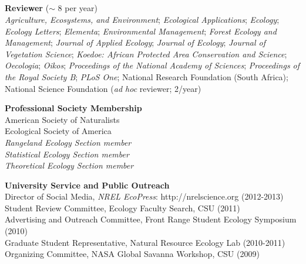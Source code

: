 \documentclass[margin,line]{resume}
\begin{document}
\begin{resume}
     \section{\textmd{\textsf{\color{MidnightBlue}{Professional\\Service}}}}
    \textbf{Reviewer} ($\sim$ 8 per year)\\
    \textsl{Agriculture, Ecosystems, and Environment};
    \textsl{Ecological Applications};
    \textsl{Ecology};
    \textsl{Ecology Letters};
    \textsl{Elementa};
    \textsl{Environmental Management};
    \textsl{Forest Ecology and Management};
    \textsl{Journal of Applied Ecology};
    \textsl{Journal of Ecology};
    \textsl{Journal of Vegetation Science};
    \textsl{Koedoe: African Protected Area Conservation and Science};
    \textsl{Oecologia};
    \textsl{Oikos};
    \textsl{Proceedings of the National Academy of Sciences};
    \textsl{Proceedings of the Royal Society B};
     \textsl{PLoS One};
     National Research Foundation (South Africa);
     National Science Foundation (\emph{ad hoc} reviewer; 2/year)
	

 \textbf{Professional Society Membership}\\
        American Society of Naturalists\\
    	Ecological Society of America\\
	\phantom{} \quad \emph{Rangeland Ecology Section member}\\
	\phantom{} \quad \emph{Statistical Ecology Section member}\\
	\phantom{} \quad \emph{Theoretical Ecology Section member}


   \textbf{University Service and Public Outreach}\\
   	Director of Social Media, \textsl{NREL EcoPress}: http://nrelscience.org (2012-2013)\\
	Student Review Committee, Ecology Faculty Search, CSU (2011)\\
	Advertising and Outreach Committee, Front Range Student Ecology Symposium (2010)\\
	Graduate Student Representative, Natural Resource Ecology Lab (2010-2011)\\
	Organizing Committee, NASA Global Savanna Workshop, CSU (2009)
  

\end{resume}
\end{document}
